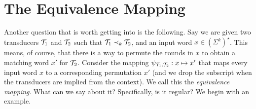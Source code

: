 \chapter{The Equivalence Mapping}
\label{chap:equiv_mapping}

Another question that is worth getting into is the following. Say we are given two transducers $\mathcal{T}_1$ and $\mathcal{T}_2$ such that $\mathcal{T}_1 \prec_{k} \mathcal{T}_2$, and an input word $x\in \left(\Sigma^k\right)^\star$. This means, of course, that there is a way to permute the rounds in $x$ to obtain a matching word $x'$ for $\mathcal{T}_2$.
Consider the mapping $\psi_{\mathcal{T}_1,\mathcal{T}_2}: x\mapsto x'$ that maps every input word $x$ to a corresponding permutation $x'$ (and we drop the subscript when the transducers are implied from the context). We call this the \emph{equivalence mapping}. What can we say about it? Specifically, is it regular? We begin with an example.

